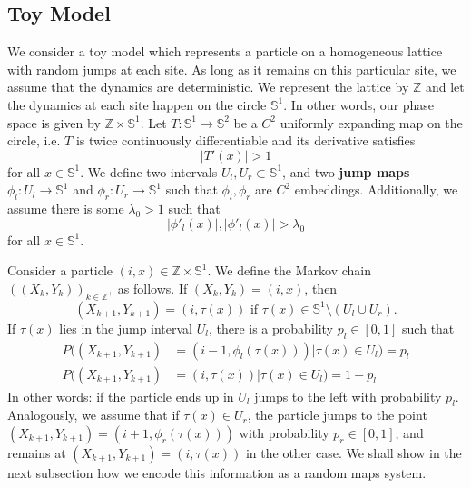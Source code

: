 \documentclass[pdftex,11pt,a4paper,oneside]{article}
\theoremstyle{plain}
\begin{document}
\subsection{Toy Model}\label{subsection:Toy Model}
We consider a toy model which represents a particle on a homogeneous lattice with random jumps at each site. As long as it remains on this particular site, we assume that the dynamics are deterministic. We represent the lattice by $\mathbb{Z}$ and let the dynamics at each site happen on the circle $\mathbb{S}^1$. In other words, our phase space is given by $\mathbb{Z}\times \mathbb{S}^1$. Let $T:\mathbb{S}^1\to\mathbb{S}^2$ be a $C^2$ uniformly expanding map on the circle, i.e. $T$ is twice continuously differentiable and its derivative satisfies
\[|T'(x)|> 1 \]
for all $x\in\mathbb{S}^1$. We define two intervals $U_l,U_r\subset \mathbb{S}^1$, and two \textbf{jump maps} $\phi_l:U_l\to \mathbb{S}^1$ and $\phi_r:U_r\to \mathbb{S}^1$ such that $\phi_l,\phi_r$ are $C^2$ embeddings. Additionally, we assume there is some $\lambda_0>1$ such that 
\[|\phi'_l(x)|,|\phi'_l(x)|> \lambda_0\]
for all $x\in \mathbb{S}^1$.

Consider a particle $(i,x)\in \mathbb{Z}\times \mathbb{S}^1$. We define the Markov chain $\left((X_k,Y_k)\right)_{k\in\mathbb{Z}^+}$ as follows. If $(X_k,Y_k) = (i,x)$, then 
\[(X_{k+1},Y_{k+1}) = (i,\tau(x)) \text{ if } \tau(x)\in \mathbb{S}^1\setminus\left(U_l\cup U_r\right).\]
If $\tau(x)$ lies in the jump interval $ U_l$, there is a probability $p_l\in [0,1]$ such that
\begin{equation}
    \begin{split}
        P\Big((X_{k+1},Y_{k+1}) &= (i-1,\phi_l(\tau(x)))\Big| \tau(x)\in U_l\Big) = p_l\\
        P\Big((X_{k+1},Y_{k+1}) &= (i,\tau(x))\Big| \tau(x)\in U_l\Big) = 1-p_l
    \end{split}
\end{equation}
In other words: if the particle ends up in $U_l$ jumps to the left with probability $p_l$. Analogously, we assume that if $\tau(x)\in U_r$, the particle jumps to the point $(X_{k+1},Y_{k+1}) =(i+1,\phi_r(\tau(x)))$ with probability $p_r\in [0,1]$, and remains at $(X_{k+1},Y_{k+1}) =(i,\tau(x))$ in the other case. We shall show in the next subsection how we encode this information as a random maps system.
\end{document}
